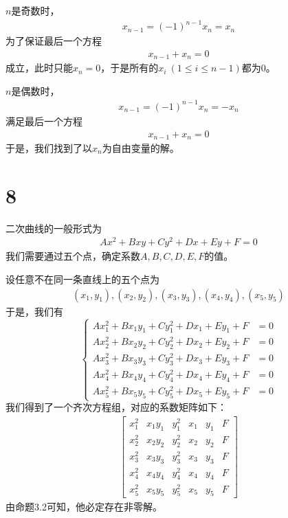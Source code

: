\documentclass{article}
\begin{document}
$n$是奇数时，
\begin{align*}
  x_{n - 1} = (-1)^{n - 1} x_n = x_n
\end{align*}
为了保证最后一个方程
\begin{align*}
  x_{n - 1} + x_n = 0
\end{align*}
成立，此时只能$x_n = 0$，于是所有的$x_i \ (1 \leq i \leq n - 1)$都为0。

$n$是偶数时，
\begin{align*}
  x_{n - 1} = (-1)^{n - 1} x_n = -x_n
\end{align*}
满足最后一个方程
\begin{align*}
  x_{n - 1} + x_n = 0
\end{align*}
于是，我们找到了以$x_n$为自由变量的解。

\section*{8}

二次曲线的一般形式为
\begin{align*}
  Ax^2 + Bxy + Cy^2 + Dx + Ey + F = 0
\end{align*}
我们需要通过五个点，确定系数$A,B,C,D,E,F$的值。

设任意不在同一条直线上的五个点为
\begin{align*}
  (x_1, y_1), (x_2, y_2), (x_3, y_3), (x_4, y_4), (x_5, y_5)
\end{align*}
于是，我们有
\begin{equation*}
  \begin{cases*}
    Ax_1^2 + Bx_1y_1 + Cy_1^2 + Dx_1 + Ey_1 + F & = 0 \\
    Ax_2^2 + Bx_2y_2 + Cy_2^2 + Dx_2 + Ey_2 + F & = 0 \\
    Ax_3^2 + Bx_3y_3 + Cy_3^2 + Dx_3 + Ey_3 + F & = 0 \\
    Ax_4^2 + Bx_4y_4 + Cy_4^2 + Dx_4 + Ey_4 + F & = 0 \\
    Ax_5^2 + Bx_5y_5 + Cy_5^2 + Dx_5 + Ey_5 + F & = 0
  \end{cases*}
\end{equation*}
我们得到了一个齐次方程组，对应的系数矩阵如下：
\begin{align*}
  \begin{bmatrix}
    x_1^2 & x_1y_1 & y_1^2 & x_1 & y_1 & F \\
    x_2^2 & x_2y_2 & y_2^2 & x_2 & y_2 & F \\
    x_3^2 & x_3y_3 & y_3^2 & x_3 & y_3 & F \\
    x_4^2 & x_4y_4 & y_4^2 & x_4 & y_4 & F \\
    x_5^2 & x_5y_5 & y_5^2 & x_5 & y_5 & F
  \end{bmatrix}
\end{align*}
由命题3.2可知，他必定存在非零解。
\end{document}
